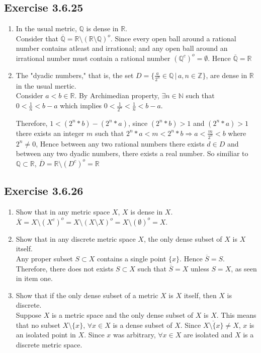 \documentclass{tufte-book}
\theoremstyle{mytheoremstyle}
\theoremstyle{mylemstyle}
\theoremstyle{mydefstyle}
\begin{document}
\subsection{Exercise 3.6.25}
\begin{enumerate}
\item In the usual metric, $\mathbb{Q}$ is dense in $\mathbb{R}$.\\
Consider that $\overline{\mathbb{Q}} = \mathbb{R} \setminus (\mathbb{R}\setminus \mathbb{Q})^o$.  Since every open ball around a rational number contains atleast and irrational; and any open ball around an irrational number must contain a rational number $(\mathbb{Q}^c)^o = \emptyset$.  Hence $\overline{\mathbb{Q}} = \mathbb{R}$

\item The "dyadic numbers," that is, the set $D = \{ \frac{a}{2^n} \in \mathbb{Q} \,|\, a,n \in \mathbb{Z}\}$, are dense in $\mathbb{R}$ in the usual mertic.\\
Consider $a < b \in \mathbb{R}$.  By Archimedian property, $\exists n \in \mathbb{N}$ such that $0 < \frac{1}{n} < b-a$ which implies $0 < \frac{1}{2^n} < \frac{1}{n} < b-a$.

Therefore, $1<(2^n *b)-(2^n*a)$, since $(2^n *b) >1$ and $(2^n *a)>1$ there exists an integer $m$ such that $2^n *a<m<2^n*b \Rightarrow a< \frac{m}{2^n} < b$ where $2^n \neq 0$,  Hence between any two rational numbers there exists $d \in D$ and between any two dyadic numbers, there exists a real number.  So similiar to $\mathbb{Q} \subset \mathbb{R}$, $\overline{D} = \mathbb{R}\setminus(D^c)^o=\mathbb{R}$

\end{enumerate}
\subsection{Exercise 3.6.26}
\begin{enumerate}

\item Show that in any metric space $X$, $X$ is dense in $X$.\\
$\overline{X} = X \setminus (X^c)^o = X\setminus(X \setminus X)^o = X\setminus (\emptyset)^o = X$.

\item Show that in any discrete metric space $X$, the only dense subset of $X$ is $X$ itself.\\
Any proper subset $S \subset X$ contains a single point $\{x\}$.  Hence $\overline{S} = S$.  Therefore, there does not exists $S \subset X$ such that $\overline{S} = X$ unless $S = X$, as seen in item one.

\item Show that if the only dense subset of a metric $X$ is $X$ itself, then $X$ is discrete.\\
Suppose $X$ is a metric space and the only dense subset of $X$ is $X$.  This means that no subset $X\setminus\{x\}$, $\forall x \in X$ is a dense subset of $X$.  Since $\overline{X\setminus\{x\}} \neq X$, $x$ is an isolated point in $X$.  Since $x$ was arbitrary, $\forall x \in X$ are isolated and $X$ is a discrete metric space.
\end{enumerate}
\end{document}
